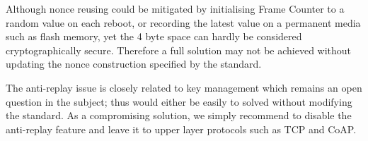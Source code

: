 Although nonce reusing could be mitigated by initialising Frame Counter to a random value on each reboot, or recording the latest value on a permanent media such as flash memory,  yet the 4 byte space can hardly be considered cryptographically secure. Therefore a full solution may not be achieved without updating the nonce construction specified by the standard\cite{802154}. 

The anti-replay issue is closely related to key management which remains an open question in the subject; thus would either be easily to solved without modifying the standard.  As a compromising solution, we simply recommend to disable the anti-replay feature and leave it to upper layer protocols such as TCP and CoAP.